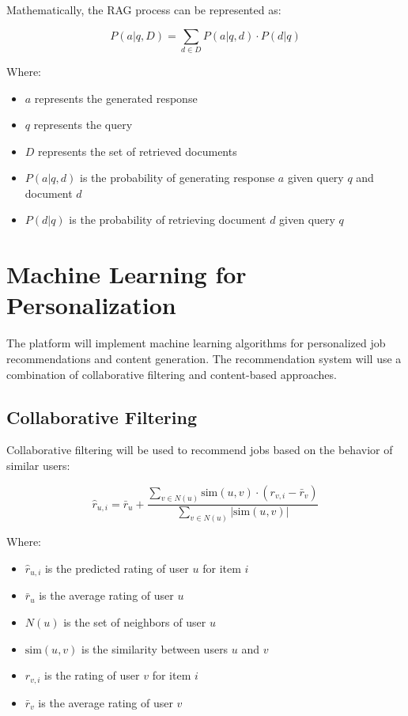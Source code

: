 \documentclass[12pt,a4paper]{report}
\begin{document}
Mathematically, the RAG process can be represented as:

\begin{equation}
    P(a|q, D) = \sum_{d \in D} P(a|q, d) \cdot P(d|q)
\end{equation}

Where:
\begin{itemize}
    \item $a$ represents the generated response
    \item $q$ represents the query
    \item $D$ represents the set of retrieved documents
    \item $P(a|q, d)$ is the probability of generating response $a$ given query $q$ and document $d$
    \item $P(d|q)$ is the probability of retrieving document $d$ given query $q$
\end{itemize}

\section*{Machine Learning for Personalization}

The platform will implement machine learning algorithms for personalized job recommendations and content generation. The recommendation system will use a combination of collaborative filtering and content-based approaches.

\subsection*{Collaborative Filtering}

Collaborative filtering will be used to recommend jobs based on the behavior of similar users:

\begin{equation}
    \hat{r}_{u,i} = \bar{r}_u + \frac{\sum_{v \in N(u)} \text{sim}(u,v) \cdot (r_{v,i} - \bar{r}_v)}{\sum_{v \in N(u)} |\text{sim}(u,v)|}
\end{equation}

Where:
\begin{itemize}
    \item $\hat{r}_{u,i}$ is the predicted rating of user $u$ for item $i$
    \item $\bar{r}_u$ is the average rating of user $u$
    \item $N(u)$ is the set of neighbors of user $u$
    \item $\text{sim}(u,v)$ is the similarity between users $u$ and $v$
    \item $r_{v,i}$ is the rating of user $v$ for item $i$
    \item $\bar{r}_v$ is the average rating of user $v$
\end{itemize}
\end{document}

